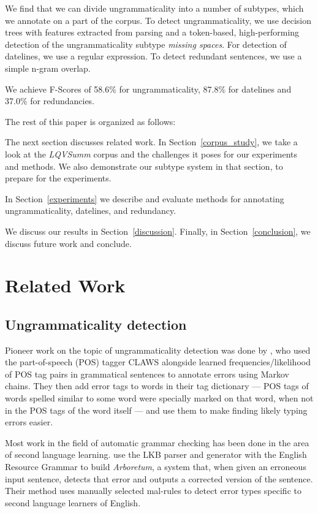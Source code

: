 \documentclass[a4paper,10pt]{scrartcl}
\theoremstyle{style}
\begin{document}
We find that we can divide ungrammaticality into a number of subtypes, which we annotate on a part of the corpus.
To detect ungrammaticality, we use decision trees with features extracted from parsing and a token-based, high-performing detection of the ungrammaticality subtype \textit{missing spaces}.
For detection of datelines, we use a regular expression. To detect redundant sentences, we use a simple n-gram overlap.

We achieve F-Scores of 58.6\% for ungrammaticality, 87.8\% for datelines and 37.0\% for redundancies.

The rest of this paper is organized as follows:

The next section discusses related work. In Section~\ref{corpus_study}, we take a look at the \textit{LQVSumm} corpus and the challenges it poses for our experiments and methods. We also demonstrate our subtype system in that section, to prepare for the experiments.

In Section~\ref{experiments} we describe and evaluate methods for annotating ungrammaticality, datelines, and redundancy.

We discuss our results in Section~\ref{discussion}. Finally, in Section~\ref{conclusion}, we discuss future work and conclude.

\newpage
\section{Related Work}
\label{related_work}

\subsection{Ungrammaticality detection}

Pioneer work on the topic of ungrammaticality detection was done by \cite{atwell1987detect}, who used the part-of-speech (POS) tagger CLAWS \citep{leech1983automatic} alongside learned frequencies/likelihood of POS tag pairs in grammatical sentences to annotate errors using Markov chains.
They then add error tags to words in their tag dictionary --- POS tags of words spelled similar to some word were specially marked on that word, when not in the POS tags of the word itself  --- and use them to make finding likely typing errors easier.

Most work in the field of automatic grammar checking has been done in the area of second language learning.
\cite{bender2004arboretum} use the LKB parser and generator \citep{copestake2002implementing} with the English Resource Grammar \citep{flickinger2000building} to build \textit{Arboretum}, a system that, when given an erroneous input sentence, detects that error and outputs a corrected version of the sentence. Their method uses manually selected mal-rules \citep{schneider1998recognizing} to detect error types specific to second language learners of English.
\end{document}
